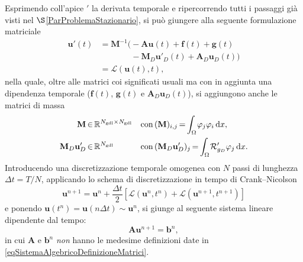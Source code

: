 \documentclass{article}
\newcommand{\de}{\mathrm{d}}
\newcommand{\Ngdl}{N_{\text{gdl}}}
\begin{document}
            Esprimendo coll'apice $'$ la derivata temporale e ripercorrendo tutti i passaggi già visti nel $\S$\ref{ParProblemaStazionario}, si può giungere alla seguente formulazione matriciale
            \begin{equation*}
                \begin{aligned}
                    \mathbf u'(t)&=
                    \mathbf M^{-1}\big(-\mathbf A\mathbf u(t)+\mathbf f(t)+\mathbf g(t)\\
                    &\qquad\quad\;\;\ -\mathbf M_D\mathbf u'_D(t)+\mathbf A_D\mathbf u_D(t)\big)\\
                    &=\mathcal L(\mathbf u(t),t),
                \end{aligned}
                \label{eqSistemaAlgebricoConDerivataTemporale}
            \end{equation*}
            nella quale, oltre alle matrici coi significati usuali ma con in aggiunta una dipendenza temporale ($\mathbf f(t)$, $\mathbf g(t)$ e $\mathbf A_D\mathbf u_D(t)$), si aggiungono anche le matrici di massa
            \begin{equation*}
                \setlength{\thinmuskip}{1mu}
                \setlength{\medmuskip}{2mu}
                \setlength{\thickmuskip}{3mu}
                \begin{aligned}
                    \mathbf M&\in\mathbb R^{\Ngdl\times\Ngdl}
                    &&\text{con}\;(\mathbf M)_{i,j}
                    =\int_\Omega\mathcal\varphi_j\varphi_i\;\de x,\\
                    \mathbf M_D\mathbf u'_D&\in\mathbb R^{\Ngdl}
                    &&\text{con}\;(\mathbf M_D\mathbf u'_D)_j
                    =\int_\Omega\mathcal R'_{g_D}\varphi_j\;\de x.
                \end{aligned}
                \label{eqSistemaAlgebricoDefinizioneMatriciPE}
            \end{equation*}
            Introducendo una discretizzazione temporale omogenea con $N$ passi di lunghezza $\Delta t=T/N$, applicando lo schema di discretizzazione in tempo di Crank–Nicolson
            \begin{equation*}
                \mathbf u^{n+1}=\mathbf u^n+\frac{\Delta t}{2}
                \left[\mathcal L(\mathbf u^n,t^n)+\mathcal L(\mathbf u^{n+1},t^{n+1})\right]
                \label{eqSchemaCrankNicolson}
            \end{equation*}
            e ponendo $\mathbf u(t^n)=\mathbf u(n\Delta t)\sim\mathbf u^n$, si giunge al seguente sistema lineare dipendente dal tempo:
            \begin{equation}
                \mathbf A\mathbf u^{n+1}=\mathbf b^n,
                \label{eqSistemaAlgebricoPE}
            \end{equation}
            in cui $\mathbf A$ e $\mathbf b^n$ \textit{non} hanno le medesime definizioni date in \eqref{eqSistemaAlgebricoDefinizioneMatrici}.
\end{document}
